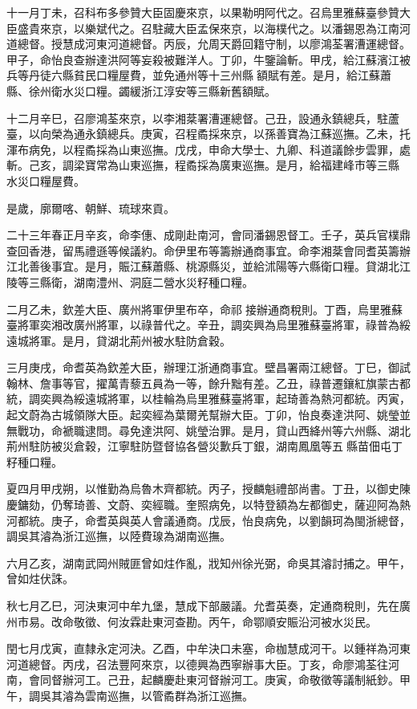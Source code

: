 \begin{pinyinscope}
十一月丁未，召科布多參贊大臣固慶來京，以果勒明阿代之。召烏里雅蘇臺參贊大臣盛貴來京，以樂斌代之。召駐藏大臣孟保來京，以海樸代之。以潘錫恩為江南河道總督。授慧成河東河道總督。丙辰，允周天爵回籍守制，以廖鴻荃署漕運總督。甲子，命怡良查辦達洪阿等妄殺被難洋人。丁卯，牛鑒論斬。甲戌，給江蘇濱江被兵等丹徒六縣貧民口糧屋費，並免通州等十三州縣額賦有差。是月，給江蘇蕭縣、徐州衛水災口糧。蠲緩浙江淳安等三縣新舊額賦。

十二月辛巳，召廖鴻荃來京，以李湘棻署漕運總督。己丑，設通永鎮總兵，駐蘆臺，以向榮為通永鎮總兵。庚寅，召程矞採來京，以孫善寶為江蘇巡撫。乙未，托渾布病免，以程矞採為山東巡撫。戊戌，申命大學士、九卿、科道議餘步雲罪，處斬。己亥，調梁寶常為山東巡撫，程矞採為廣東巡撫。是月，給福建峰市等三縣水災口糧屋費。

是歲，廓爾喀、朝鮮、琉球來貢。

二十三年春正月辛亥，命李僡、成剛赴南河，會同潘錫恩督工。壬子，英兵官樸鼎查回香港，留馬禮遜等候議約。命伊里布等籌辦通商事宜。命李湘棻會同耆英籌辦江北善後事宜。是月，賑江蘇蕭縣、桃源縣災，並給沭陽等六縣衛口糧。貸湖北江陵等三縣衛，湖南澧州、洞庭二營水災籽種口糧。

二月乙未，欽差大臣、廣州將軍伊里布卒，命祁接辦通商稅則。丁酉，烏里雅蘇臺將軍奕湘改廣州將軍，以祿普代之。辛丑，調奕興為烏里雅蘇臺將軍，祿普為綏遠城將軍。是月，貸湖北荊州被水駐防倉穀。

三月庚戌，命耆英為欽差大臣，辦理江浙通商事宜。壁昌署兩江總督。丁巳，御試翰林、詹事等官，擢萬青藜五員為一等，餘升黜有差。乙丑，祿普遷鑲紅旗蒙古都統，調奕興為綏遠城將軍，以桂輪為烏里雅蘇臺將軍，起琦善為熱河都統。丙寅，起文蔚為古城領隊大臣。起奕經為葉爾羌幫辦大臣。丁卯，怡良奏達洪阿、姚瑩並無戰功，命褫職逮問。尋免達洪阿、姚瑩治罪。是月，貸山西絳州等六州縣、湖北荊州駐防被災倉穀，江寧駐防暨督協各營災歉兵丁銀，湖南鳳凰等五縣苗佃屯丁籽種口糧。

夏四月甲戌朔，以惟勤為烏魯木齊都統。丙子，授麟魁禮部尚書。丁丑，以御史陳慶鏞劾，仍奪琦善、文蔚、奕經職。奎照病免，以特登額為左都御史，薩迎阿為熱河都統。庚子，命耆英與英人會議通商。戊辰，怡良病免，以劉韻珂為閩浙總督，調吳其濬為浙江巡撫，以陸費瑔為湖南巡撫。

六月乙亥，湖南武岡州賊匪曾如炷作亂，戕知州徐光弼，命吳其濬討捕之。甲午，曾如炷伏誅。

秋七月乙巳，河決東河中牟九堡，慧成下部嚴議。允耆英奏，定通商稅則，先在廣州市易。改命敬徵、何汝霖赴東河查勘。丙午，命鄂順安賑沿河被水災民。

閏七月戊寅，直隸永定河決。乙酉，中牟決口未塞，命枷慧成河干。以鍾祥為河東河道總督。丙戌，召法豐阿來京，以德興為西寧辦事大臣。丁亥，命廖鴻荃往河南，會同督辦河工。己丑，起麟慶赴東河督辦河工。庚寅，命敬徵等議制紙鈔。甲午，調吳其濬為雲南巡撫，以管矞群為浙江巡撫。


\end{pinyinscope}
